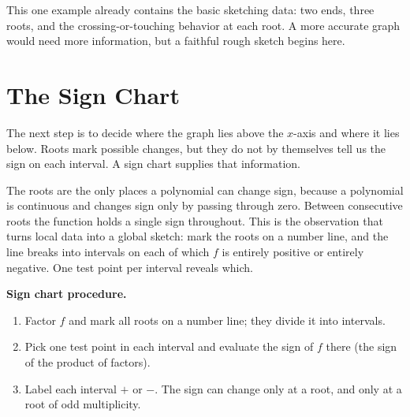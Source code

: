 \documentclass[12pt]{book}
\begin{document}
This one example already contains the basic sketching data: two ends, three roots,
and the crossing-or-touching behavior at each root. A more accurate graph would need
more information, but a faithful rough sketch begins here.


\section{The Sign Chart}

The next step is to decide where the graph lies above the $x$-axis and where it lies
below. Roots mark possible changes, but they do not by themselves tell us the sign on
each interval. A sign chart supplies that information.

The roots are the only places a polynomial can change sign, because a polynomial is
continuous and changes sign only by passing through zero. Between consecutive roots
the function holds a single sign throughout. This is the observation that turns local
data into a global sketch: mark the roots on a number line, and the line breaks into
intervals on each of which $f$ is entirely positive or entirely negative. One test
point per interval reveals which.

\begin{keyidea}
\textbf{Sign chart procedure.}
\begin{enumerate}\setlength{\itemsep}{2pt}
  \item Factor $f$ and mark all roots on a number line; they divide it into intervals.
  \item Pick one test point in each interval and evaluate the sign of $f$ there
        (the sign of the product of factors).
  \item Label each interval $+$ or $-$. The sign can change only at a root, and only
        at a root of odd multiplicity.
\end{enumerate}
\end{keyidea}
\end{document}
